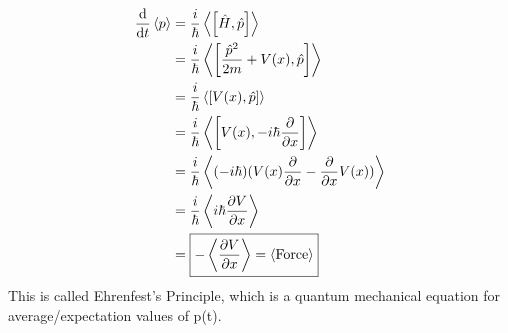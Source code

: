 \documentclass{school-22.101-notes}
\begin{document}

\begin{align}
\frac{\mathrm{d}}{\mathrm{d}t} \left< p \right> &= \frac{i}{\hbar} \left< \left[ \hat{H}, \hat{p} \right] \right> \\
&= \frac{i}{\hbar} \left< \left[ \frac{\hat{p}^2}{2m} + V(x), \hat{p} \right] \right> \\
&= \frac{i}{\hbar} \left< \left[ V(x) , \hat{p} \right] \right> \\
&= \frac{i}{\hbar} \left< \left[ V(x), - i\hbar \frac{\partial}{\partial x} \right] \right> \\
&= \frac{i}{\hbar} \left< (-i\hbar) (V(x) \frac{\partial}{\partial x} - \frac{\partial}{\partial x} V(x)) \right> \\
&= \frac{i}{\hbar} \left< i\hbar\frac{\partial V}{\partial x} \right> \\
&= \boxed{- \left< \frac{\partial V}{\partial x} \right> = \left< \mathrm{Force} \right> }
\end{align}
This is called Ehrenfest's Principle, which is a quantum mechanical equation for average/expectation values of p(t). 
\end{document}
